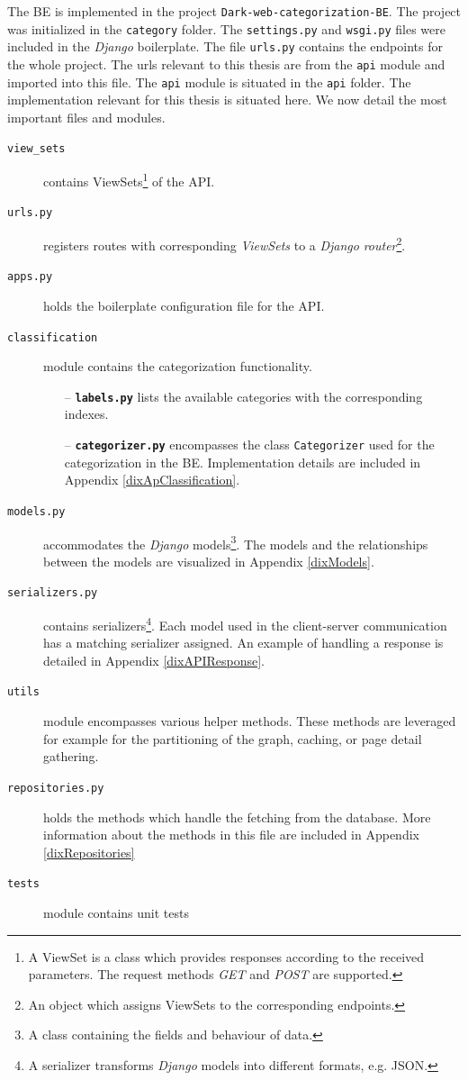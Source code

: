 The BE is implemented in the project \texttt{Dark-web-categorization-BE}. The project was initialized in the \texttt{category} folder. The \texttt{settings.py} and \texttt{wsgi.py} files were included in the \textit{Django} boilerplate. The file \texttt{urls.py} contains the endpoints for the whole project. The urls relevant to this thesis are from the \texttt{api} module and imported into this file.
The \texttt{api} module is situated in the \texttt{api} folder. The implementation relevant for this thesis is situated here. We now detail the most important files and modules. 
\begin{description}
    \item[\texttt{view\_sets}] contains ViewSets\footnote{A ViewSet is a class which provides responses according to the received parameters. The request methods \textit{GET} and \textit{POST} are supported.} of the API.
    \item [\texttt{urls.py}] registers routes with corresponding \textit{ViewSets} to a \textit{Django} \textit{router}\footnote{An object which assigns ViewSets to the corresponding endpoints.}.
    \item[\texttt{apps.py}] holds the boilerplate configuration file for the API.
    \item[\texttt{classification}] module contains the categorization functionality.
        \begin{itemize}            
            \item[--] \textbf{\texttt{labels.py}} lists the available categories with the corresponding indexes. 
            \item[--] \textbf{\texttt{categorizer.py}} encompasses the class \texttt{Categorizer} used for the categorization in the BE. Implementation details are included in Appendix \ref{dixApClassification}.
        \end{itemize} 
    \item[\texttt{models.py}] accommodates the \textit{Django} models\footnote{A class containing the fields and behaviour of data.}. The models and the relationships between the models are visualized in Appendix \ref{dixModels}. 
    \item[\texttt{serializers.py}] contains serializers\footnote{A serializer transforms \textit{Django} models into different formats, e.g. JSON.}. Each model used in the client-server communication has a matching serializer assigned. An example of handling a response is detailed in Appendix \ref{dixAPIResponse}.
    \item[\texttt{utils}] module encompasses various helper methods. These methods are leveraged for example for the partitioning of the graph, caching, or page detail gathering.
    \item[\texttt{repositories.py}] holds the methods which handle the fetching from the database. More information about the methods in this file are included in Appendix \ref{dixRepositories}
    \item[\texttt{tests}] module contains unit tests
\end{description} 





